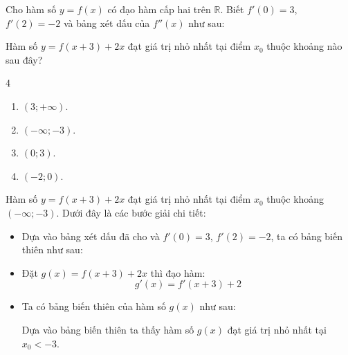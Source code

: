 \begin{baitap}
	Cho hàm số $y = f(x)$ có đạo hàm cấp hai trên $\mathbb{R}$. Biết $f'(0) = 3$, $f'(2) = -2$ và bảng xét dấu của $f''(x)$ như sau:
	\begin{center}
	\end{center}
	
	Hàm số $y = f(x + 3) + 2x$ đạt giá trị nhỏ nhất tại điểm $x_0$ thuộc khoảng nào sau đây?
	\begin{multicols}{4}
		\begin{enumerate}
			\item $(3; +\infty)$.
			\item $(-\infty; -3)$.
			\item $(0; 3)$.
			\item $(-2; 0)$.
		\end{enumerate}
	\end{multicols}
	\begin{traloi}
		 Hàm số $y = f(x + 3) + 2x$ đạt giá trị nhỏ nhất tại điểm $x_0$ thuộc khoảng $(-\infty; -3)$. Dưới đây là các bước giải chi tiết:
		\begin{itemize}
			\item Dựa vào bảng xét dấu đã cho và $f'(0) = 3$, $f'(2) = -2$, ta có bảng biến thiên như sau:
			\begin{center}
			\end{center}
			\item Đặt $g(x) = f(x + 3) + 2x$ thì đạo hàm:
			$$g'(x) = f'(x + 3) + 2$$
			\item Ta có bảng biến thiên của hàm số $ g(x) $ như sau:
			\begin{center}
			\end{center}
			Dựa vào bảng biến thiên ta thấy hàm số $g(x)$ đạt giá trị nhỏ nhất tại $x_0<-3$.
		\end{itemize}
	\end{traloi}
\end{baitap}


